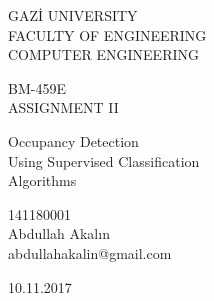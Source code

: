 \begin{titlepage}
    \begin{center}
        \begin{large}
            \vspace*{0.5cm}
            GAZ\.{I} UNIVERSITY \\
            FACULTY OF ENGINEERING \\ 
            COMPUTER ENGINEERING

            \vfill
            BM-459E \\
            ASSIGNMENT II

            \vfill
            Occupancy Detection \\
            Using Supervised Classification \\
            Algorithms

            \vfill
            141180001\\Abdullah Akalın\\abdullahakalin@gmail.com

            \vfill
            \vspace{0.5cm}
            10.11.2017
        \end{large}
    \end{center}
\end{titlepage}
